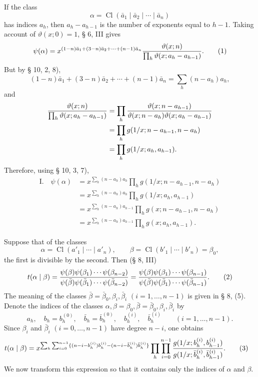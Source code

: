 \documentclass[11pt,a4paper]{article}
\newcommand{\Cl}{\operatorname{Cl}}
\begin{document}
If the class
\[
 \alpha=\Cl(\bar a_1\mid\bar a_2\mid\cdots\mid\bar a_n)
\]
has indices $a_h$, then $a_h-a_{h-1}$ is the number of exponents equal to $h-1$. Taking account of $\vartheta(x;0)=1$, § 6, III gives
\begin{equation}
 \psi(\alpha)=x^{(1-n)\bar a_1+(3-n)\bar a_2+\cdots+(n-1)\bar a_n}
 {\vartheta(x;n)\over\prod_h\vartheta(x;a_h-a_{h-1})}.
\tag{1}
\end{equation}
But by § 10, 2, 8),
\[
 (1-n)\bar a_1+(3-n)\bar a_2+\cdots+(n-1)\bar a_n=\sum_h(n-a_h)a_h,
\]
and
\begin{align*}
 {\vartheta(x;n)\over\prod_h\vartheta(x;a_h-a_{h-1})}
 &=\prod_h {\vartheta(x;n-a_{h-1})\over\vartheta(x;n-a_h)\vartheta(x;a_h-a_{h-1})}\\
 &=\prod_h g(1/x;n-a_{h-1},n-a_h)\\
 &=\prod_h g(1/x;a_h,a_{h-1}).
\end{align*}
Therefore, using § 10, 3, 7),
\begin{align*}
\text{I.}\quad
\psi(\alpha)&=x^{\sum_h(n-a_h)a_h}\prod_h g(1/x;n-a_{h-1},n-a_h)\\
&=x^{\sum_h(n-a_h)a_h}\prod_h g(1/x;a_h,a_{h-1})\\
&=x^{\sum_h(n-a_h)a_{h-1}}\prod_h g(x;n-a_{h-1},n-a_h)\\
&=x^{\sum_h(n-a_h)a_{h-1}}\prod_h g(x;a_h,a_{h-1}).
\end{align*}

Suppose that of the classes
\[
 \alpha=\Cl(a'_1\mid\cdots\mid a'_n),\qquad
 \beta=\Cl(b'_1\mid\cdots\mid b'_n)=\beta_0,
\]
the first is divisible by the second. Then (§ 8, III)
\begin{equation}
 t(\alpha\mid\beta)=
 {\psi(\beta)\psi(\beta_1)\cdots\psi(\beta_{n-2})
  \over
  \psi(\bar\beta)\psi(\bar\beta_1)\cdots\psi(\bar\beta_{n-2})}
 = {\psi(\beta)\psi(\beta_1)\cdots\psi(\beta_{n-1})
  \over
  \psi(\bar\beta)\psi(\bar\beta_1)\cdots\psi(\bar\beta_{n-1})}.
\tag{2}
\end{equation}
The meaning of the classes $\bar\beta=\bar\beta_0,\beta_i,\bar\beta_i$ $(i=1,
\ldots,n-1)$ is given in § 8, (5). Denote the indices of the classes $\alpha,\beta=\beta_0,\bar\beta=\bar\beta_0,\beta_i,\bar\beta_i$ by
\[
 a_h,
 \quad b_h=b_h^{(0)},\quad \bar b_h=\bar b_h^{(0)},
 \quad b_h^{(i)},\quad \bar b_h^{(i)}\qquad(i=1,\ldots,n-1).
\]
Since $\beta_i$ and $\bar\beta_i$ $(i=0,
\ldots,n-1)$ have degree $n-i$, one obtains
\begin{align}
 t(\alpha\mid\beta)
&=x^{\sum_h\sum_{i=0}^{n-1}\{(n-i-b_h^{(i)})b_h^{(i)}-(n-i-\bar b_h^{(i)})\bar b_h^{(i)}\}}
 \prod_h\prod_{i=0}^{n-1}
 {g(1/x;b_h^{(i)},b_{h-1}^{(i)})\over
 g(1/x;\bar b_h^{(i)},\bar b_{h-1}^{(i)})}.
\tag{3}
\end{align}
We now transform this expression so that it contains only the indices of $\alpha$ and $\beta$.
\end{document}
